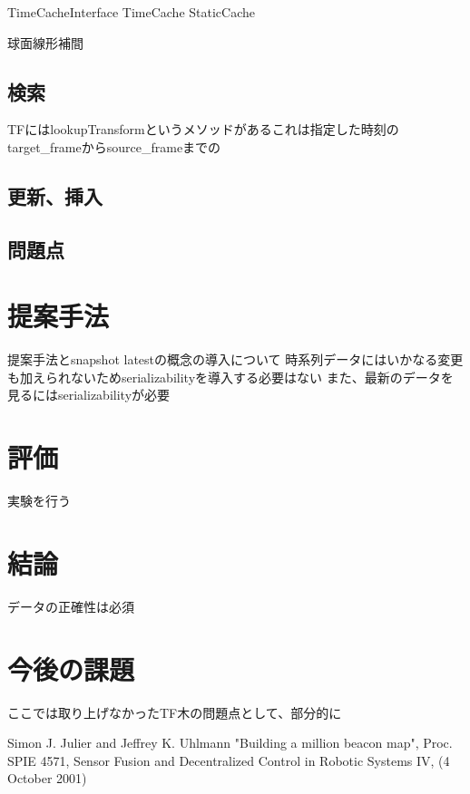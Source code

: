 \documentclass{article}
\begin{document}
\begin{multicols}{2}
TimeCacheInterface
TimeCache
StaticCache

球面線形補間

\subsection{検索}

TFにはlookupTransformというメソッドがあるこれは指定した時刻のtarget\_frameからsource\_frameまでの


\subsection{更新、挿入}





\subsection{問題点}

\section{提案手法}

提案手法とsnapshot latestの概念の導入について
時系列データにはいかなる変更も加えられないためserializabilityを導入する必要はない
また、最新のデータを見るにはserializabilityが必要

\section{評価}
実験を行う

\section{結論}

データの正確性は必須

\section{今後の課題}

ここでは取り上げなかったTF木の問題点として、部分的に

	
\begin{thebibliography}{99}

 Simon J. Julier and Jeffrey K. Uhlmann "Building a million beacon map", Proc. SPIE 4571, Sensor Fusion and Decentralized Control in Robotic Systems IV, (4 October 2001)


\end{thebibliography}
\end{multicols}
\end{document}
